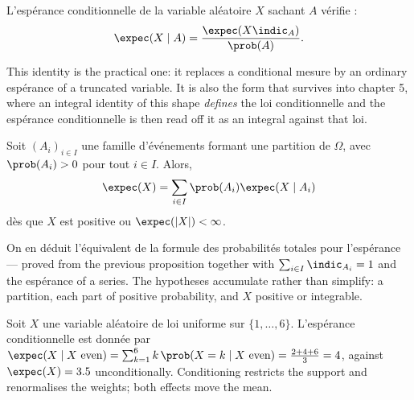 \begin{prop}
  L'espérance conditionnelle de la variable aléatoire $X$ sachant $A$ vérifie :
  \[ \expec(X \mid A) = \frac{\expec(X \indic_{A})}{\prob(A)}. \]
\end{prop}

This identity is the practical one: it replaces a conditional mesure by an
ordinary espérance of a truncated variable. It is also the form that survives
into chapter 5, where an integral identity of this shape \emph{defines} the
loi conditionnelle and the espérance conditionnelle is then read off it as
an integral against that loi.

\begin{prop}
  Soit $(A_{i})_{i \in I}$ une famille d'événements formant une partition de
  $\Omega$, avec $\prob(A_{i}) > 0$ pour tout $i \in I$. Alors,
  \[ \expec(X) = \sum_{i \in I} \prob(A_{i}) \expec(X \mid A_{i}) \]
  dès que $X$ est positive ou $\expec(|X|) < \infty$.
\end{prop}

On en déduit l'équivalent de la formule des probabilités totales pour
l'espérance --- proved from the previous proposition together with
$\sum_{i \in I} \indic_{A_{i}} = 1$ and the espérance of a series. The
hypotheses accumulate rather than simplify: a partition, each part of positive
probability, and $X$ positive or integrable.

\begin{example}
  Soit $X$ une variable aléatoire de loi uniforme sur $\{1,\dots,6\}$.
  L'espérance conditionnelle est donnée par
  $\expec(X \mid X \text{ even}) = \sum_{k=1}^{6} k\,\prob(X=k \mid X \text{
  even}) = \tfrac{2+4+6}{3} = 4$, against $\expec(X) = 3.5$ unconditionally.
  Conditioning restricts the support and renormalises the weights; both effects
  move the mean.
\end{example}

